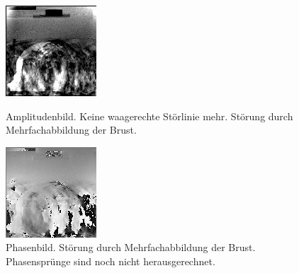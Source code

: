 \documentclass[
    11pt,
    ngerman
]{scrreprt}
\begin{document}
\begin{figure}
    \begin{minipage}[htbp]{.45\textwidth}
        \centering
        \includegraphics[width=\textwidth]{Abbildungen/2015-02-27_25_1_amp_kontrast.png}
        \caption{Amplitudenbild. Keine waagerechte Störlinie mehr. Störung durch Mehrfachabbildung der Brust.}
        \label{fig:2015-02-27_25_1_amp}
    \end{minipage}
    \hfill
    \begin{minipage}[htbp]{.45\textwidth}
        \centering
        \includegraphics[width=\textwidth]{Abbildungen/2015-02-27_26_1_phase.png}
        \caption{Phasenbild. Störung durch Mehrfachabbildung der Brust. Phasensprünge sind noch nicht herausgerechnet.}
        \label{fig:2015-02-27_26_1_phase}
    \end{minipage}
\end{figure}
\end{document}

